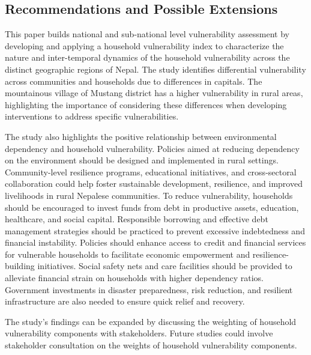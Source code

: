 \subsection{Recommendations and Possible Extensions}

This paper builds national and sub-national level vulnerability assessment \cite{antwi2013characterising, aksha2019analysis, shahiestimating} by developing and applying a household vulnerability index to characterize the nature and inter-temporal dynamics of the household vulnerability across the distinct geographic regions of Nepal. The study identifies differential vulnerability across communities and households due to differences in capitals. The mountainous village of Mustang district has a higher vulnerability in rural areas, highlighting the importance of considering these differences when developing interventions to address specific vulnerabilities.

The study also highlights the positive relationship between environmental dependency and household vulnerability. Policies aimed at reducing dependency on the environment should be designed and implemented in rural settings. Community-level resilience programs, educational initiatives, and cross-sectoral collaboration could help foster sustainable development, resilience, and improved livelihoods in rural Nepalese communities. To reduce vulnerability, households should be encouraged to invest funds from debt in productive assets, education, healthcare, and social capital. Responsible borrowing and effective debt management strategies should be practiced to prevent excessive indebtedness and financial instability. Policies should enhance access to credit and financial services for vulnerable households to facilitate economic empowerment and resilience-building initiatives. Social safety nets and care facilities should be provided to alleviate financial strain on households with higher dependency ratios. Government investments in disaster preparedness, risk reduction, and resilient infrastructure are also needed to ensure quick relief and recovery.

The study's findings can be expanded by discussing the weighting of household vulnerability components with stakeholders. Future studies could involve stakeholder consultation on the weights of household vulnerability components.
